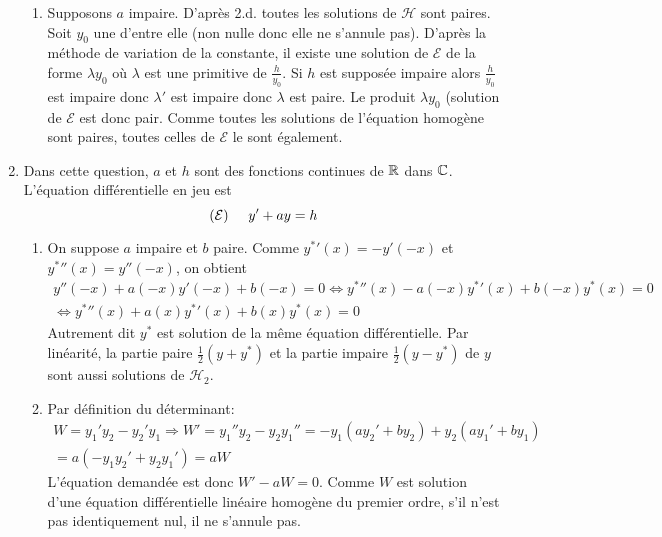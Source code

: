 \begin{enumerate}
\begin{enumerate}
 \item Supposons $a$ impaire. D'après 2.d. toutes les solutions de $\mathcal{H}$ sont paires. Soit $y_0$ une d'entre elle (non nulle donc elle ne s'annule pas). D'après la méthode de variation de la constante, il existe une solution de $\mathcal{E}$ de la forme $\lambda y_0$ où $\lambda$ est une primitive de $\frac{h}{y_0}$. Si $h$ est supposée impaire alors $\frac{h}{y_0}$ est impaire donc $\lambda'$ est impaire donc $\lambda$ est paire. Le produit $\lambda y_0$ (solution de $\mathcal{E}$ est donc pair. Comme toutes les solutions de l'équation homogène sont paires, toutes celles de $\mathcal{E}$ le sont également.
\end{enumerate}

 \item Dans cette question, $a$ et $h$ sont des fonctions continues de $\mathbb{R}$ dans $\mathbb{C}$. L'équation différentielle en jeu est
\[
 (\mathcal{E})\hspace{0.5cm} y' + a y = h
\]
\begin{enumerate}
 \item On suppose $a$ impaire et $b$ paire. Comme ${y^*}'(x) = -y'(-x)$ et ${y^*}''(x) = y''(-x)$, on obtient
\begin{multline*}
 y''(-x) + a(-x)y'(-x) + b(-x) = 0 \Leftrightarrow {y^*}''(x) - a(-x){y^*}'(x) + b(-x)y^*(x) = 0 \\
 \Leftrightarrow {y^*}''(x) + a(x){y^*}'(x) + b(x)y^*(x) = 0
\end{multline*}
Autrement dit $y^*$ est solution de la même équation différentielle.\newline
Par linéarité, la partie paire $\frac{1}{2}(y + y^*)$ et la partie impaire $\frac{1}{2}(y - y^*)$ de $y$ sont aussi solutions de $\mathcal{H}_2$.

 \item Par définition du déterminant:
\begin{multline*}
W = y_1'y_2 - y_2'y_1 \Rightarrow W' = y_1''y_2 - y_2y_1''
= -y_1\left( ay_2' + by_2\right) + y_2\left( ay_1' + by_1\right) \\
= a\left( -y_1y_2' + y_2y_1'\right) = a W 
\end{multline*}
L'équation demandée est donc $W' - aW =0$.\newline 
Comme $W$ est solution d'une équation différentielle linéaire homogène du premier ordre, s'il n'est pas identiquement nul, il ne s'annule pas.
 

\end{enumerate}
\end{enumerate}
